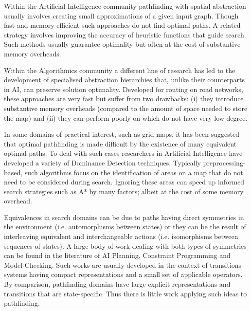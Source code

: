 Within the Artificial Intelligence community pathfinding with spatial abstraction usually involves
creating small approximations of a given input graph.  Though fast and memory efficient such
approaches do not find optimal paths.  A related strategy involves improving the accuracy of 
heuristic functions that guide search. Such methods usually guarantee optimality but often at the 
cost of substantive memory overheads.  

Within the Algorithmics community a different line of research has led to the development of 
specialised abstraction hierarchies that, unlike their counterparts in AI, can preserve solution 
optimality. Developed for routing on road networks, these approaches are
very fast but suffer from two drawbacks: (i) they introduce substantive memory overheads 
(compared to the amount of space needed to store the map) and (ii) they can perform poorly on 
which do not have very low degree.

In some domains of practical interest, such as grid maps, it has been suggested that optimal
pathfinding is made difficult by the existence of many equivalent optimal paths. To deal
with such cases researchers in Artificial Intelligence have developed a variety of 
Dominance Detection techniques.  Typically preprocessing-based, such algorithms focus on the 
identification of areas on a map that do not need to be considered during search. Ignoring 
these areas can speed up informed search strategies such as A* by many factors; albeit at the 
cost of some memory overhead.

Equivalences in search domains can be due to paths having direct symmetries in the environment (i.e.
automorphisms between states) or they can be the result of interleaving equivalent and
interchangeable actions (i.e. isomorphisms between sequences of states). A large body of work
dealing with both types of symmetries can be found in the literature of AI Planning, Constraint
Programming and Model Checking. Such works are usually developed in the context of transitions
systems having compact representations and a small set of applicable operators. By comparison,
pathfinding domains have large explicit representations and transitions that are state-specific.
Thus there is little work applying such ideas to pathfinding.

